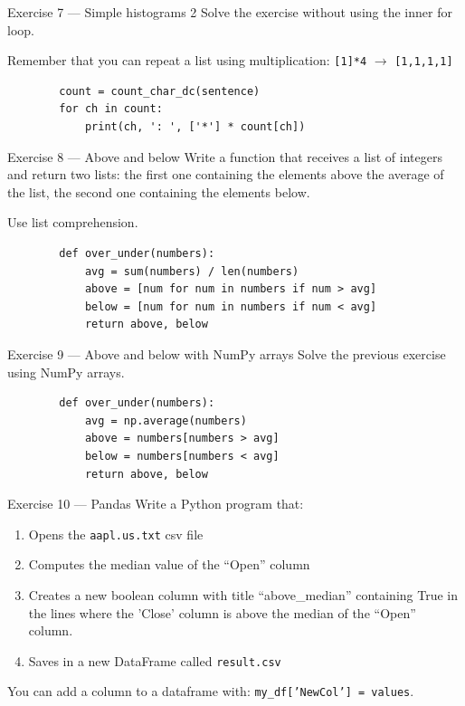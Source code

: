 \documentclass[aspectratio=169,handout]{beamer}
\begin{document}
\begin{frame}[fragile]{Exercise 7 --- Simple histograms 2}
    Solve the exercise without using the inner for loop.

    Remember that you can repeat a list using multiplication: \texttt{[1]*4} $\rightarrow$ \texttt{[1,1,1,1]}

    \pause
    \begin{verbatim}
        count = count_char_dc(sentence)
        for ch in count:
            print(ch, ': ', ['*'] * count[ch])
    \end{verbatim}
\end{frame}

\begin{frame}[fragile]{Exercise 8 --- Above and below}
    Write a function that receives a list of integers and return two lists: the first one containing the elements above
    the average of the list, the second one containing the elements below.

    Use list comprehension.


    \pause
    \begin{verbatim}
        def over_under(numbers):
            avg = sum(numbers) / len(numbers)
            above = [num for num in numbers if num > avg]
            below = [num for num in numbers if num < avg]
            return above, below
    \end{verbatim}
\end{frame}

\begin{frame}[fragile]{Exercise 9 --- Above and below with NumPy arrays}
    Solve the previous exercise using NumPy arrays.

    \pause
    \begin{verbatim}
        def over_under(numbers):
            avg = np.average(numbers)
            above = numbers[numbers > avg]
            below = numbers[numbers < avg]
            return above, below
    \end{verbatim}
\end{frame}

\begin{frame}{Exercise 10 --- Pandas}
    Write a Python program that:
    \begin{enumerate}
        \item Opens the \texttt{aapl.us.txt} csv file
        \item Computes the median value of the ``Open'' column
        \item Creates a new boolean column with title ``above\_median'' containing True in the lines where the 'Close'
            column is above the median of the ``Open'' column.
            \item Saves in a new DataFrame called \texttt{result.csv}
    \end{enumerate}

    You can add a column to a dataframe with: \texttt{my\_df['NewCol'] = values}.

    \framebreak
    \inputminted[autogobble, fontsize=\small]{Python}{./code/pandas_median.py}

\end{frame}
\end{document}
